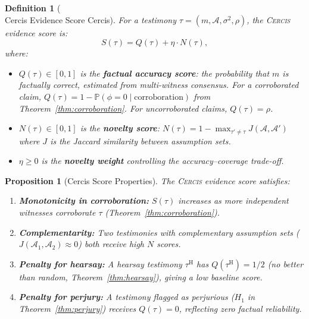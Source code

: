 \documentclass[11pt,a4paper]{article}
\newtheorem{proposition}[theorem]{Proposition}
\newtheorem{definition}[theorem]{Definition}
\theoremstyle{definition}
\newcommand{\Cercis}{\textsc{Cercis}}
\newcommand{\Pbb}{\mathbb{P}}
\newcommand{\fact}{\phi}                        %
\newcommand{\hear}{\mathrm{H}}                  %
\begin{document}
\begin{definition}[\\Cercis{} Evidence Score Cercis]
\label{def:cercis}
For a testimony $\tau = (m, \mathcal{A}, \sigma^2, \rho)$, the \Cercis{} evidence score is:
\begin{equation}
    S(\tau) = Q(\tau) + \eta \cdot N(\tau),
    \label{eq:cercis}
\end{equation}
where:
\begin{itemize}
    \item $Q(\tau) \in [0, 1]$ is the \textbf{factual accuracy score}: the probability that $m$ is factually correct, estimated from multi-witness consensus. For a corroborated claim, $Q(\tau) = 1 - \Pbb(\fact = 0 \mid \text{corroboration})$ from Theorem~\ref{thm:corroboration}. For uncorroborated claims, $Q(\tau) = \rho$.
    \item $N(\tau) \in [0, 1]$ is the \textbf{novelty score}: $N(\tau) = 1 - \max_{\tau' \neq \tau} J(\mathcal{A}, \mathcal{A}')$ where $J$ is the Jaccard similarity between assumption sets.
    \item $\eta \geq 0$ is the \textbf{novelty weight} controlling the accuracy--coverage trade-off.
\end{itemize}
\end{definition}

\begin{proposition}[Cercis Score Properties]
\label{prop:cercis_props}
The \Cercis{} evidence score satisfies:
\begin{enumerate}[label=(\roman*)]
    \item \textbf{Monotonicity in corroboration:} $S(\tau)$ increases as more independent witnesses corroborate $\tau$ (Theorem~\ref{thm:corroboration}).
    \item \textbf{Complementarity:} Two testimonies with complementary assumption sets ($J(\mathcal{A}_1, \mathcal{A}_2) \approx 0$) both receive high $N$ scores.
    \item \textbf{Penalty for hearsay:} A hearsay testimony $\tau^{\hear}$ has $Q(\tau^{\hear}) = 1/2$ (no better than random, Theorem~\ref{thm:hearsay}), giving a low baseline score.
    \item \textbf{Penalty for perjury:} A testimony flagged as perjurious ($H_1$ in Theorem~\ref{thm:perjury}) receives $Q(\tau) = 0$, reflecting zero factual reliability.
\end{enumerate}
\end{proposition}

\end{document}
